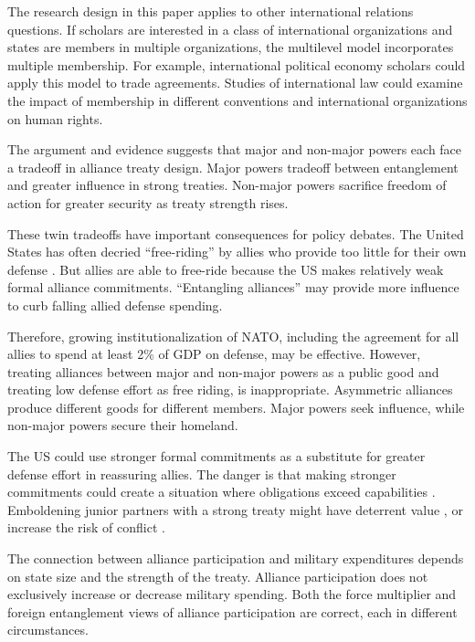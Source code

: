 \documentclass[12pt]{article}
\begin{document}
The research design in this paper applies to other international relations questions.
If scholars are interested in a class of international organizations and states are members in multiple organizations, the multilevel model incorporates multiple membership.
For example, international political economy scholars could apply this model to trade agreements. 
Studies of international law could examine the impact of membership in different conventions and international organizations on human rights. 


The argument and evidence suggests that major and non-major powers each face a tradeoff in alliance treaty design. 
Major powers tradeoff between entanglement and greater influence in strong treaties. 
Non-major powers sacrifice freedom of action for greater security as treaty strength rises. 


These twin tradeoffs have important consequences for policy debates.
The United States has often decried ``free-riding'' by allies who provide too little for their own defense \citep{Lanoszka2015}. 
But allies are able to free-ride because the US makes relatively weak formal alliance commitments. 
``Entangling alliances'' may provide more influence to curb falling allied defense spending. 

 
Therefore, growing institutionalization of NATO, including the agreement for all allies to spend at least 2\% of GDP on defense, may be effective. 
However, treating alliances between major and non-major powers as a public good and treating low defense effort as free riding, is inappropriate. 
Asymmetric alliances produce different goods for different members. 
Major powers seek influence, while non-major powers secure their homeland. 


The US could use stronger formal commitments as a substitute for greater defense effort in reassuring allies.
The danger is that making stronger commitments could create a situation where obligations exceed capabilities \citep{Kennedy1987}. 
Emboldening junior partners with a strong treaty might have deterrent value \citep{Bensonetal2014}, or increase the risk of conflict \citep{Benson2012}. 

 
The connection between alliance participation and military expenditures depends on state size and the strength of the treaty.  
Alliance participation does not exclusively increase or decrease military spending.  
Both the force multiplier and foreign entanglement views of alliance participation are correct, each in different circumstances. 




\singlespace
 
 
\end{document}
